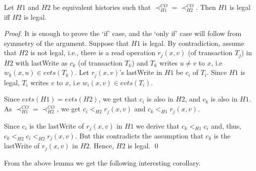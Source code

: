 \documentclass{llncs}
\newcommand{\cmnt}[1]{}
\newcommand{\eqnref}[1]{Eqn(\ref{eq:#1})}
\newcommand{\op} {operation}
\newcommand{\evts}[1] {evts(#1)}
\newcommand{\lastw} {lastWrite}
\newcommand{\legal} {legal}
\begin{document}
\begin{lemma}
\label{lem:ap-eqv-legal}
Let $H1$ and $H2$ be equivalent histories such that 
$\prec_{H1}^{CO} = \prec_{H2}^{CO}$. 
Then $H1$ is \legal{} iff $H2$ is \legal. 
\end{lemma}

\begin{proof}
It is enough to prove the `if' case, and the `only if' case will follow
from symmetry of the argument. 
Suppose that $H1$ is \legal{}. 
By contradiction, assume that $H2$ is not \legal, i.e.,
there is a read \op{} $r_j(x,v)$ (of transaction $T_j$) in $H2$ with
\lastw{} as $c_k$ (of transaction $T_k$) and $T_k$ writes $u \neq v$
to $x$, i.e $w_k(x, u) \in \evts{T_k}$. 
Let $r_j(x,v)$'s \lastw{} in $H1$ be $c_i$ of $T_i$. 
Since $H1$ is legal, $T_i$ writes $v$ to $x$, i.e $w_i(x, v) \in
\evts{T_i}$. 

Since $\evts{H1} = \evts{H2}$, we get that $c_i$ is also in $H2$, and
$c_k$ is also in $H1$. 
As $\prec_{H1}^{CO} = \prec_{H2}^{CO}$,
we get $c_i <_{H2} r_j(x, v)$ and $c_k <_{H1} r_j(x, v)$. 

Since $c_i$ is the \lastw{} of $r_j(x,v)$ in $H1$ we derive that 
$c_k <_{H1} c_i$ and, thus, $c_k <_{H2} c_i <_{H2} r_j(x, v)$.
But this contradicts the assumption that $c_k$ is the \lastw{} of
$r_j(x,v)$ in $H2$.
Hence, $H2$ is legal. \qed
\cmnt{
from the w-r conflict order we get that 
\begin{equation}
\label{eq:wr}
c_i <_{H2} r_j(x, v)
\end{equation}

Now, we have two cases based on the ordering of $c_k$ and $r_j$ in $H1$:

\begin{itemize}
\item[] Case (1) $r_j(x, v) <_{H1} c_k$: Since $\prec_{H1}^{CO} = \prec_{H2}^{CO}$, from r-w conflict order we get that $r_j <_{H2} c_k$. This implies that $c_k$ can not be $r_j$'s \lastw{} in $H2$ which is a contradiction. 

\item[] Case (2) $c_k <_{H1} r_j(x, v)$: From w-r conflict order equivalence of $\prec_{H1}^{CO} = \prec_{H2}^{CO}$, we get that $c_k <_{H2} r_j$. Here, we again have two cases based on the ordering of $c_i$ and $c_k$ in $H1$, Case (2.1) $c_i <_{H1} c_k$: In this case, we have that $c_i <_{H1} c_k <_{H1} r_j$ which implies that $c_i$ is not $r_j$'s \lastw{} in $H2$, a contradiction. Case (2.2) $c_k <_{H1} c_i$: From w-w conflict order equivalence of $\prec_{H1}^{CO} = \prec_{H2}^{CO}$, we get that $c_k <_{H2} c_i$. Combining this with \eqnref{wr}, we have that $c_k <_{H2} c_i <_{H2} r_j$. This implies that $c_k$ can not be $r_j$'s \lastw{} in $H2$ which is a contradiction.
\end{itemize}
Thus in all the cases, we get that $c_k$ can not be $r_j$'s
\lastw. This implies that $H2$ is legal. 
}
\end{proof}
From the above lemma we get the following interesting corollary.
\end{document}
